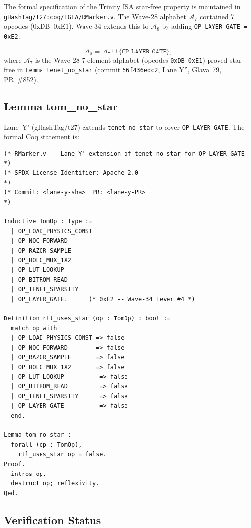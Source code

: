 The formal specification of the Trinity ISA star-free property is maintained
in \texttt{gHashTag/t27:coq/IGLA/RMarker.v}.  The Wave-28 alphabet
\(\mathcal{A}_{7}\) contained 7 opcodes (0xDB--0xE1).  Wave-34 extends this
to \(\mathcal{A}_{8}\) by adding \texttt{OP\_LAYER\_GATE = 0xE2}.

\begin{definition}
\label{def:alphabet_8}
\[
  \mathcal{A}_{8} = \mathcal{A}_{7} \cup \bigl\{\mathtt{OP\_LAYER\_GATE}\bigr\},
\]
where \(\mathcal{A}_{7}\) is the Wave-28 7-element alphabet (opcodes
\texttt{0xDB}--\texttt{0xE1}) proved star-free in
\texttt{Lemma tenet\_no\_star} (commit \texttt{56f436edc2},
Lane Y'', Glava~79, PR~\#852).
\end{definition}

\subsection{Lemma tom\_no\_star}

Lane~Y' (gHashTag/t27) extends \texttt{tenet\_no\_star} to cover
\texttt{OP\_LAYER\_GATE}.  The formal Coq statement is:

\begin{lstlisting}[language=Coq, caption={Coq lemma tom\_no\_star from RMarker.v}, label={lst:tom_no_star}]
(* RMarker.v -- Lane Y' extension of tenet_no_star for OP_LAYER_GATE *)
(* SPDX-License-Identifier: Apache-2.0                                *)
(* Commit: <lane-y-sha>  PR: <lane-y-PR>                              *)

Inductive TomOp : Type :=
  | OP_LOAD_PHYSICS_CONST
  | OP_NOC_FORWARD
  | OP_RAZOR_SAMPLE
  | OP_HOLO_MUX_1X2
  | OP_LUT_LOOKUP
  | OP_BITROM_READ
  | OP_TENET_SPARSITY
  | OP_LAYER_GATE.      (* 0xE2 -- Wave-34 Lever #4 *)

Definition rtl_uses_star (op : TomOp) : bool :=
  match op with
  | OP_LOAD_PHYSICS_CONST => false
  | OP_NOC_FORWARD        => false
  | OP_RAZOR_SAMPLE       => false
  | OP_HOLO_MUX_1X2       => false
  | OP_LUT_LOOKUP          => false
  | OP_BITROM_READ         => false
  | OP_TENET_SPARSITY      => false
  | OP_LAYER_GATE          => false
  end.

Lemma tom_no_star :
  forall (op : TomOp),
    rtl_uses_star op = false.
Proof.
  intros op.
  destruct op; reflexivity.
Qed.
\end{lstlisting}

\subsection{Verification Status}


